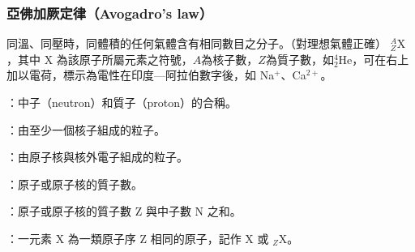 \documentclass[a4paper,12pt]{article}
\begin{document}
\subsubsection{亞佛加厥定律（Avogadro's law）}
同溫、同壓時，同體積的任何氣體含有相同數目之分子。（對理想氣體正確）
$^{A}_{Z}\text{X}$，其中 X 為該原子所屬元素之符號，$A$為核子數，$Z$為質子數，如$^4_2$He，可在右上加以電荷，標示為電性在印度—阿拉伯數字後，如 Na$^+$、Ca$^{2+}$。
\bit
\item{}：中子（neutron）和質子（proton）的合稱。
\item{}：由至少一個核子組成的粒子。
\item{}：由原子核與核外電子組成的粒子。
\item{}：原子或原子核的質子數。
\item{}：原子或原子核的質子數 Z 與中子數 N 之和。
\item{}：一元素 X 為一類原子序 Z 相同的原子，記作 X 或 $_{Z}\text{X}$。
\eit
{}
\end{document}
